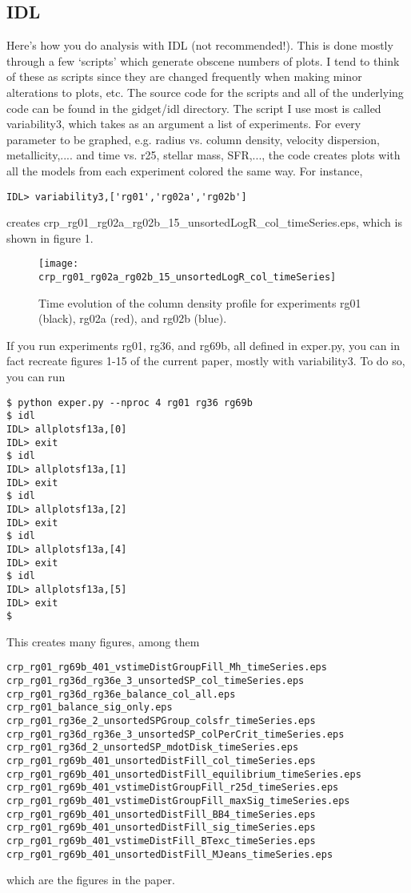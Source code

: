 \documentclass[11pt]{amsart}
\begin{document}
\subsection{IDL}
Here's how you do analysis with IDL (not recommended!). This is done mostly through a few `scripts' which generate obscene numbers of plots. I tend to think of these as scripts since they are changed frequently when making minor alterations to plots, etc. The source code for the scripts and all of the underlying code can be found in the gidget/idl directory. The script I use most is called variability3, which takes as an argument a list of experiments. For every parameter to be graphed, e.g. radius vs. column density, velocity dispersion, metallicity,.... and time vs. r25, stellar mass, SFR,..., the code creates plots with all the models from each experiment colored the same way. For instance,
\begin{verbatim}
IDL> variability3,['rg01','rg02a','rg02b']
\end{verbatim}
creates crp\_rg01\_rg02a\_rg02b\_15\_unsortedLogR\_col\_timeSeries.eps, which is shown in figure 1.
\begin{figure}
\texttt{[image: crp\_rg01\_rg02a\_rg02b\_15\_unsortedLogR\_col\_timeSeries]}
\caption{Time evolution of the column density profile for experiments rg01 (black), rg02a (red), and rg02b (blue).}
\end{figure}
If you run experiments rg01, rg36, and rg69b, all defined in exper.py, you can in fact recreate figures 1-15 of the current paper, mostly with variability3. To do so, you can run
\begin{verbatim}
$ python exper.py --nproc 4 rg01 rg36 rg69b
$ idl
IDL> allplotsf13a,[0]
IDL> exit 
$ idl
IDL> allplotsf13a,[1]
IDL> exit 
$ idl
IDL> allplotsf13a,[2]
IDL> exit 
$ idl
IDL> allplotsf13a,[4]
IDL> exit 
$ idl
IDL> allplotsf13a,[5]
IDL> exit 
$
\end{verbatim}
This creates many figures, among them
\begin{verbatim}
crp_rg01_rg69b_401_vstimeDistGroupFill_Mh_timeSeries.eps
crp_rg01_rg36d_rg36e_3_unsortedSP_col_timeSeries.eps
crp_rg01_rg36d_rg36e_balance_col_all.eps
crp_rg01_balance_sig_only.eps
crp_rg01_rg36e_2_unsortedSPGroup_colsfr_timeSeries.eps
crp_rg01_rg36d_rg36e_3_unsortedSP_colPerCrit_timeSeries.eps
crp_rg01_rg36d_2_unsortedSP_mdotDisk_timeSeries.eps
crp_rg01_rg69b_401_unsortedDistFill_col_timeSeries.eps
crp_rg01_rg69b_401_unsortedDistFill_equilibrium_timeSeries.eps
crp_rg01_rg69b_401_vstimeDistGroupFill_r25d_timeSeries.eps
crp_rg01_rg69b_401_vstimeDistGroupFill_maxSig_timeSeries.eps
crp_rg01_rg69b_401_unsortedDistFill_BB4_timeSeries.eps
crp_rg01_rg69b_401_unsortedDistFill_sig_timeSeries.eps
crp_rg01_rg69b_401_vstimeDistFill_BTexc_timeSeries.eps
crp_rg01_rg69b_401_unsortedDistFill_MJeans_timeSeries.eps
\end{verbatim}
which are the figures in the paper.



\end{document}
